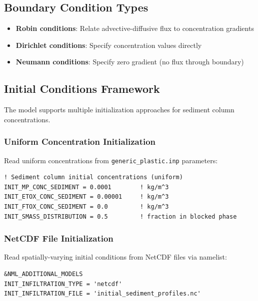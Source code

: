 \documentclass[11pt,a4paper]{article}
\begin{document}
\subsection{Boundary Condition Types}
\begin{itemize}
    \item \textbf{Robin conditions}: Relate advective-diffusive flux to concentration gradients
    \item \textbf{Dirichlet conditions}: Specify concentration values directly
    \item \textbf{Neumann conditions}: Specify zero gradient (no flux through boundary)
\end{itemize}

\subsection{Initial Conditions Framework}

The model supports multiple initialization approaches for sediment column concentrations.

\subsubsection{Uniform Concentration Initialization}

Read uniform concentrations from \texttt{generic\_plastic.inp} parameters:

\begin{verbatim}
! Sediment column initial concentrations (uniform)
INIT_MP_CONC_SEDIMENT = 0.0001        ! kg/m^3
INIT_ETOX_CONC_SEDIMENT = 0.00001     ! kg/m^3  
INIT_FTOX_CONC_SEDIMENT = 0.0         ! kg/m^3
INIT_SMASS_DISTRIBUTION = 0.5         ! fraction in blocked phase
\end{verbatim}

\subsubsection{NetCDF File Initialization}

Read spatially-varying initial conditions from NetCDF files via namelist:

\begin{verbatim}
&NML_ADDITIONAL_MODELS
INIT_INFILTRATION_TYPE = 'netcdf'
INIT_INFILTRATION_FILE = 'initial_sediment_profiles.nc'
\end{verbatim}
\end{document}
